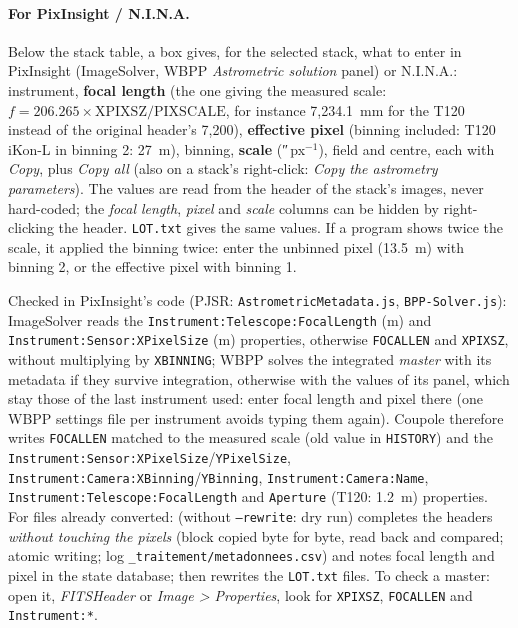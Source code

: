 \paragraph{For PixInsight / N.I.N.A.} Below the stack table, a box gives, for the selected stack, what to enter in
PixInsight (ImageSolver, WBPP \emph{Astrometric solution} panel) or N.I.N.A.: instrument, \textbf{focal length} (the
one giving the measured scale: $f = 206.265 \times \mathrm{XPIXSZ} / \mathrm{PIXSCALE}$, for instance 7,234.1~mm for
the T120 instead of the original header's 7,200), \textbf{effective pixel} (binning included: T120 iKon-L in
binning 2: 27~\textmu m), binning, \textbf{scale} (\si{\arcsecond}\,px$^{-1}$), field and centre, each with
\emph{Copy}, plus \emph{Copy all} (also on a stack's right-click: \emph{Copy the astrometry parameters}). The values
are read from the header of the stack's images, never hard-coded; the \emph{focal length}, \emph{pixel} and
\emph{scale} columns can be hidden by right-clicking the header. \texttt{LOT.txt} gives the same values. If a
program shows twice the scale, it applied the binning twice: enter the unbinned pixel (13.5~\textmu m) with binning
2, or the effective pixel with binning 1.

Checked in PixInsight's code (PJSR: \texttt{AstrometricMetadata.js}, \texttt{BPP-Solver.js}): ImageSolver reads the
\texttt{Instrument:Telescope:FocalLength} (m) and \texttt{Instrument:Sensor:XPixelSize} (\textmu m) properties,
otherwise \texttt{FOCALLEN} and \texttt{XPIXSZ}, without multiplying by \texttt{XBINNING}; WBPP solves the integrated
\emph{master} with its metadata if they survive integration, otherwise with the values of its panel, which stay those
of the last instrument used: enter focal length and pixel there (one WBPP settings file per instrument avoids typing
them again). Coupole therefore writes \texttt{FOCALLEN} matched to the measured scale (old value in \texttt{HISTORY})
and the \texttt{Instrument:Sensor:XPixelSize}/\texttt{YPixelSize}, \texttt{Instrument:Camera:XBinning}/\texttt{YBinning},
\texttt{Instrument:Camera:Name}, \texttt{Instrument:Telescope:FocalLength} and \texttt{Aperture} (T120: 1.2~m)
properties. For files already converted:  (without \texttt{--rewrite}:
dry run) completes the headers \emph{without touching the pixels} (block copied byte for byte, read back and
compared; atomic writing; log \texttt{\_traitement/metadonnees.csv}) and notes focal length and pixel in the state
database;  then rewrites the \texttt{LOT.txt} files. To check a master: open it,
\emph{FITSHeader} or \emph{Image > Properties}, look for \texttt{XPIXSZ}, \texttt{FOCALLEN} and \texttt{Instrument:*}.

